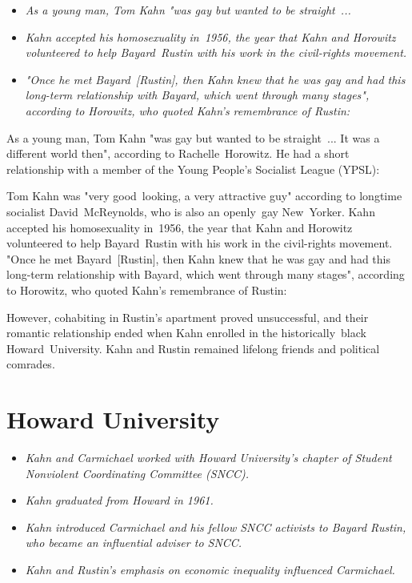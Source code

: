 \begin{itemize}
\item
  \emph{As a young man, Tom Kahn "was gay but wanted to be straight~...}
\item
  \emph{Kahn accepted his homosexuality in~1956, the year that Kahn and
  Horowitz volunteered to help Bayard~Rustin with his work in the
  civil-rights movement.}
\item
  \emph{"Once he met Bayard~{[}Rustin{]}, then Kahn knew that he was gay
  and had this long-term relationship with Bayard, which went through
  many stages", according to Horowitz, who quoted Kahn's remembrance of
  Rustin:}
\end{itemize}

As a young man, Tom Kahn "was gay but wanted to be straight~... It was a
different world then", according to Rachelle~Horowitz. He had a short
relationship with a member of the Young People's Socialist League
(YPSL):

Tom Kahn was "very good~looking, a very attractive guy" according to
longtime socialist David~McReynolds, who is also an openly~gay
New~Yorker. Kahn accepted his homosexuality in~1956, the year that Kahn
and Horowitz volunteered to help Bayard~Rustin with his work in the
civil-rights movement. "Once he met Bayard~{[}Rustin{]}, then Kahn knew
that he was gay and had this long-term relationship with Bayard, which
went through many stages", according to Horowitz, who quoted Kahn's
remembrance of Rustin:

However, cohabiting in Rustin's apartment proved unsuccessful, and their
romantic relationship ended when Kahn enrolled in the historically~black
Howard~University. Kahn and Rustin remained lifelong friends and
political comrades.

\section{Howard University}\label{howard-university}

\begin{itemize}
\item
  \emph{Kahn and Carmichael worked with Howard University's chapter of
  Student Nonviolent Coordinating Committee (SNCC).}
\item
  \emph{Kahn graduated from Howard in 1961.}
\item
  \emph{Kahn introduced Carmichael and his fellow SNCC activists to
  Bayard Rustin, who became an influential adviser to SNCC.}
\item
  \emph{Kahn and Rustin's emphasis on economic inequality influenced
  Carmichael.}
\end{itemize}

